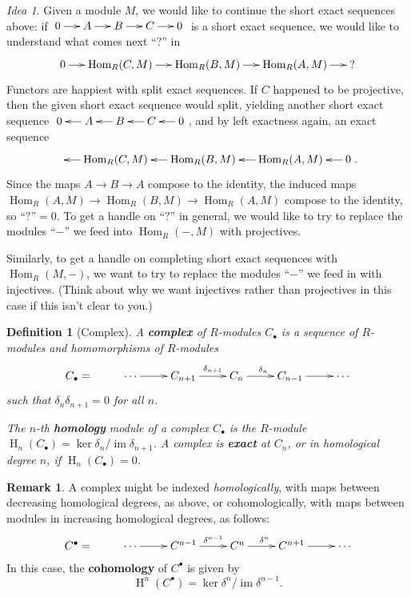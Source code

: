 \documentclass[11pt]{book}
\newtheorem{definition}[theorem]{Definition}
\numberwithin{equation}{section}
\numberwithin{theorem}{chapter}
\theoremstyle{definition}
\newtheorem*{basic properties}{Basic Properties}
\newtheorem*{Important Remark}{Important Remark}
\newtheorem{remark}[theorem]{Remark}
\theoremstyle{remark}
\newtheorem{idea}[theorem]{Idea}
\newcommand{\Hom}{\operatorname{Hom}}
\renewcommand{\ker}{\operatorname{ker}}
\DeclareMathOperator{\im}{im}
\renewcommand{\H}{\operatorname{H}}
\begin{document}
\begin{idea}
	Given a module $M$, we would like to continue the short exact sequences above: if $\xymatrix@C=5mm{0 \ar[r] & A \ar[r] & B \ar[r] & C \ar[r] & 0}$ is a short exact sequence, we would like to understand what comes next ``$?$'' in
	\[\xymatrix@C=5mm{0 \ar[r] & \Hom_R(C,M) \ar[r] & \Hom_R(B,M) \ar[r] & \Hom_R(A,M) \ar[r] & ?}\]
	Functors are happiest with split exact sequences. If $C$ happened to be projective, then the given short exact sequence would split, yielding another short exact sequence $\xymatrix@C=5mm{0 & A \ar[l] & B \ar[l] & C \ar[l] & 0 \ar[l]}$, and by left exactness again, an exact sequence
	\[\xymatrix@C=5mm{ & \Hom_R(C,M) \ar[l] & \Hom_R(B,M) \ar[l] & \Hom_R(A,M) \ar[l] & 0 \ar[l]}.\]
	Since the maps $A\to B \to A$ compose to the identity, the induced maps $\Hom_R(A,M) \to \Hom_R(B,M) \to \Hom_R(A,M)$ compose to the identity, so ``$?$''$=0$.
To get a handle on ``$?$'' in general, we would like to try to replace the modules ``$-$'' we feed into $\Hom_R(-,M)$ with projectives.

Similarly, to get a handle on completing short exact sequences with $\Hom_R(M,-)$, we want to try to replace the modules ``$-$'' we feed in with injectives. (Think about why we want injectives rather than projectives in this case if this isn't clear to you.)
	
\end{idea}

\begin{definition}[Complex]
	A {\bf complex} of $R$-modules $C_\bullet$ is a sequence of $R$-modules and homomorphisms of $R$-modules
	$$\xymatrix{C_\bullet = & \cdots \ar[r] & C_{n+1} \ar[r]^-{\delta_{n+1}} & C_n \ar[r]^{\delta_n} & C_{n-1} \ar[r] & \cdots}$$
	such that $\delta_n \delta_{n+1} = 0$ for all $n$.
	
	The $n$-th {\bf homology} module of a complex $C_\bullet$ is the $R$-module $\H_n(C_\bullet) = \ker \delta_n / \im \delta_{n+1}$.
	A complex is {\bf exact} at $C_n$, or in homological degree $n$, if $\H_n(C_\bullet) = 0$.
\end{definition}


\begin{remark}
	A complex might be indexed \emph{homologically}, with maps between decreasing homological degrees, as above, or cohomologically, with maps between modules in increasing homological degrees, as follows:
	$$\xymatrix{C^\bullet = & \cdots \ar[r] & C^{n-1} \ar[r]^-{\delta^{n-1}} & C^n \ar[r]^{\delta^n} & C^{n+1} \ar[r] & \cdots}$$
	In this case, the {\bf cohomology} of $C^\bullet$ is given by
	$$\H^n(C^\bullet) = \ker \delta^n / \im \delta^{n-1}.$$
\end{remark}
\end{document}
